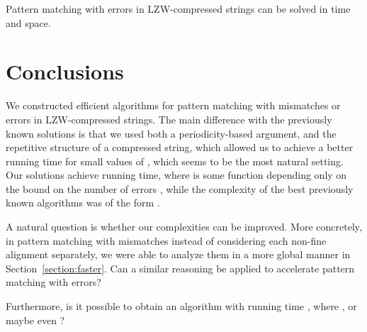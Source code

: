 \documentclass[runningheads]{llncs}
\begin{document}
\begin{theorem}
Pattern matching with  errors in LZW-compressed strings can be solved in  time and  space.
\end{theorem}

\section{Conclusions}

We constructed efficient algorithms for pattern matching with  mismatches or errors in LZW-compressed strings. The main difference with the previously known solutions is that we used both a periodicity-based argument, and the repetitive structure of a compressed string, which allowed us to achieve a better running time for small values of , which seems to be the most natural setting. Our solutions achieve  running time, where  is some function depending only on the bound on the number of errors , while the complexity of the best previously known algorithms was of the form .

A natural question is whether our complexities can be improved. More concretely, in pattern matching with  mismatches instead of considering each non-fine alignment separately, we were able to analyze them in a more global manner in Section~\ref{section:faster}. Can a similar reasoning be applied to accelerate pattern matching with  errors?

Furthermore, is it possible to obtain an algorithm with running time , where , or maybe even ?



\end{document}
